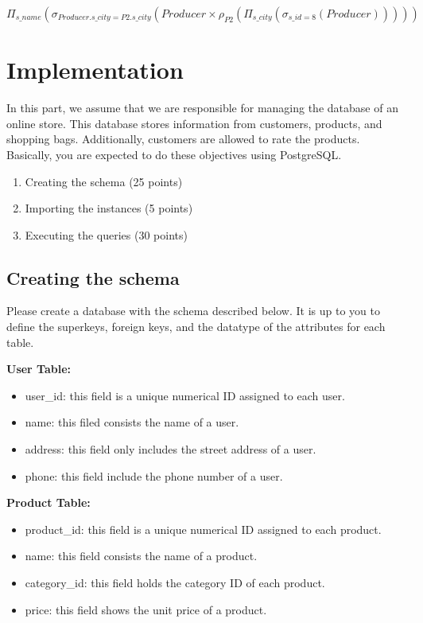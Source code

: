 \documentclass{homework}
\begin{document}
    $\Pi_{s\_name}(\sigma_{Producer.s\_city = P2.s\_city}(Producer \times \rho_{P2}(\Pi_{s\_city}(\sigma_{s\_id=8}(Producer)))))$


\section*{Implementation}
In this part, we assume that we are responsible for managing the database of an online store. This database stores information from customers, products, and shopping bags. Additionally, customers are allowed to rate the products. Basically, you are expected to do these objectives using PostgreSQL.
\begin{enumerate}
    \item Creating the schema (25 points)
    \item Importing the instances (5 points)
    \item Executing the queries (30 points)
\end{enumerate}

\subsection*{Creating the schema}
Please create a database with the schema described below. It is up to you to define the superkeys, foreign keys, and the datatype of the attributes for each table.

\textbf{User Table:}
\begin{itemize}
    \item user\_id: this field is a unique numerical ID assigned to each user.
    \item name: this filed consists the name of a user.
    \item address: this field only includes the street address of a user.
    \item phone: this field include the phone number of a user.
\end{itemize}

\textbf{Product Table:}
\begin{itemize}
    \item product\_id: this field is a unique numerical ID assigned to each product.
    \item name: this field consists the name of a product.
    \item category\_id: this field holds the category ID of each product.
    \item price: this field shows the unit price of a product.
\end{itemize}
\end{document}
